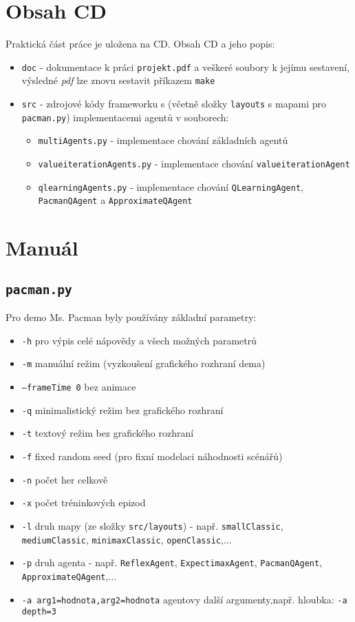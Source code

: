 \chapter{Obsah CD}
Praktická část práce je uložena na CD. Obsah CD a jeho popis:
\begin{itemize}
\item \texttt{doc} - dokumentace k práci \texttt{projekt.pdf} a veškeré soubory k jejímu sestavení, výsledné \textit{pdf} lze znovu sestavit příkazem \texttt{make}
\item \texttt{src} - zdrojové kódy frameworku s (včetně složky \texttt{layouts} s mapami pro \texttt{pacman.py}) implementacemi agentů v souborech:
\begin{itemize}
\item \texttt{multiAgents.py} - implementace chování základních agentů
\item \texttt{valueiterationAgents.py} - implementace chování \texttt{valueiterationAgent}
\item \texttt{qlearningAgents.py} - implementace chování \texttt{QLearningAgent}, \texttt{PacmanQAgent} a \texttt{ApproximateQAgent}
\end{itemize}
\end{itemize}

\chapter{Manuál}
\label{priloha:manual}
\section{\texttt{pacman.py}}
\label{priloha:manualp}
Pro demo Ms. Pacman byly používány základní parametry:
\begin{itemize}
\item \texttt{-h} pro výpis celé nápovědy a všech možných parametrů
\item \texttt{-m} manuální režim (vyzkoušení grafického rozhraní dema)
\item \texttt{--frameTime 0} bez animace
\item \texttt{-q} minimalistický režim bez grafického rozhraní
\item \texttt{-t} textový režim bez grafického rozhraní 
\item \texttt{-f} fixed random seed (pro fixní modelaci náhodnosti scénářů)
\item \texttt{-n} počet her celkově
\item \texttt{-x} počet tréninkových epizod
\item \texttt{-l} druh mapy (ze složky \texttt{src/layouts}) - např. \texttt{smallClassic}, \texttt{mediumClassic}, \newline \texttt{minimaxClassic}, \texttt{openClassic},...
\item \texttt{-p} druh agenta - např. \texttt{ReflexAgent}, \texttt{ExpectimaxAgent}, \newline \texttt{PacmanQAgent}, \texttt{ApproximateQAgent},...
\item \texttt{-a arg1=hodnota,arg2=hodnota} agentovy další argumenty,\newline např. hloubka: \texttt{-a depth=3}
\end{itemize}
